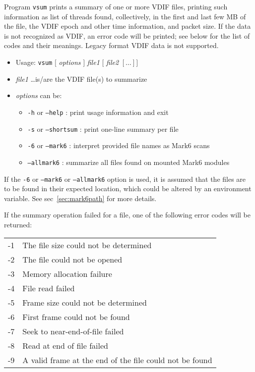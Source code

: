 Program {\tt vsum} prints a summary of one or more VDIF files, printing such information as list of threads found, collectively, in the first and last few MB of the file, the VDIF epoch and other time information, and packet size.
If the data is not recognized as VDIF, an error code will be printed; see below for the list of codes and their meanings.
Legacy format VDIF data is not supported.

\begin{itemize}
\item[] Usage: {\tt vsum} $[$ {\em options} $]$ {\em file1} $[$ {\em file2} $[ \ldots ] ]$
\item[] {\em file1} \ldots is/are the VDIF file(s) to summarize
\item[] {\em options} can be:
\begin{itemize}
\item[] {\tt -h} or {\tt --help} : print usage information and exit
\item[] {\tt -s} or {\tt --shortsum} : print one-line summary per file
\item[] {\tt -6} or {\tt --mark6} : interpret provided file names as Mark6 scans
\item[] {\tt --allmark6} : summarize all files found on mounted Mark6 modules
\end{itemize}
\end{itemize}

If the {\tt -6} or {\tt --mark6} or {\tt --allmark6} option is used, it is assumed that the files are to be found in their expected location, which could be altered by an environment variable.
See sec~\ref{sec:mark6path} for more details.

If the summary operation failed for a file, one of the following error codes will be returned:
\begin{center}
\begin{tabular}{ll}
-1 & The file size could not be determined \\
-2 & The file could not be opened \\
-3 & Memory allocation failure \\
-4 & File read failed \\
-5 & Frame size could not be determined \\
-6 & First frame could not be found \\
-7 & Seek to near-end-of-file failed \\
-8 & Read at end of file failed \\
-9 & A valid frame at the end of the file could not be found \\
\end{tabular}
\end{center}

